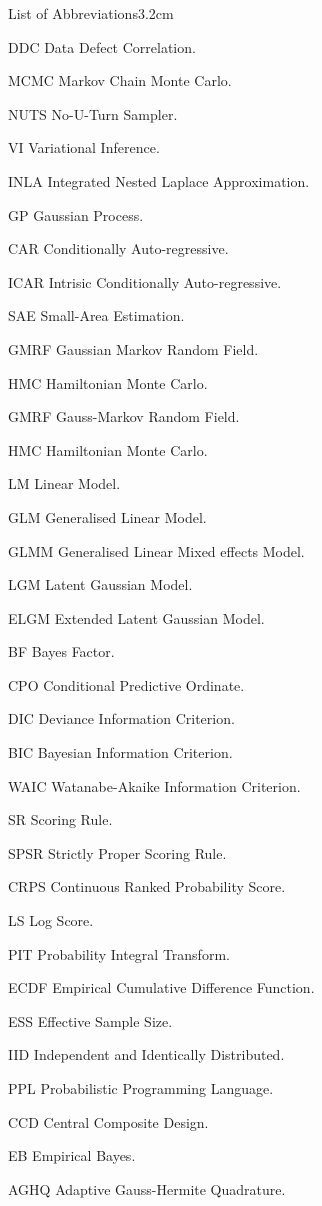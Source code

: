 \begin{mclistof}{List of Abbreviations}{3.2cm}
\item[DDC] Data Defect Correlation.
\item[MCMC] Markov Chain Monte Carlo.
\item[NUTS] No-U-Turn Sampler.
\item[VI] Variational Inference.
\item[INLA] Integrated Nested Laplace Approximation.
\item[GP] Gaussian Process.
\item[CAR] Conditionally Auto-regressive.
\item[ICAR] Intrisic Conditionally Auto-regressive.
\item[SAE] Small-Area Estimation.
\item[GMRF] Gaussian Markov Random Field.
\item[HMC] Hamiltonian Monte Carlo.
\item[GMRF] Gauss-Markov Random Field.
\item[HMC] Hamiltonian Monte Carlo.
\item[LM] Linear Model.
\item[GLM] Generalised Linear Model.
\item[GLMM] Generalised Linear Mixed effects Model.
\item[LGM] Latent Gaussian Model.
\item[ELGM] Extended Latent Gaussian Model.
\item[BF] Bayes Factor.
\item[CPO] Conditional Predictive Ordinate.
\item[DIC] Deviance Information Criterion.
\item[BIC] Bayesian Information Criterion.
\item[WAIC] Watanabe-Akaike Information Criterion.
\item[SR] Scoring Rule.
\item[SPSR] Strictly Proper Scoring Rule.
\item[CRPS] Continuous Ranked Probability Score.
\item[LS] Log Score.
\item[PIT] Probability Integral Transform.
\item[ECDF] Empirical Cumulative Difference Function.
\item[ESS] Effective Sample Size.
\item[IID] Independent and Identically Distributed.
\item[PPL] Probabilistic Programming Language.
\item[CCD] Central Composite Design.
\item[EB] Empirical Bayes.
\item[AGHQ] Adaptive Gauss-Hermite Quadrature.

\end{mclistof} 
